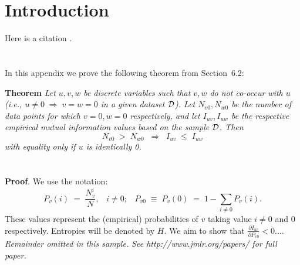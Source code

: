 \documentclass[twoside,11pt]{article}
\newcommand{\dataset}{{\cal D}}
\newcommand{\fracpartial}[2]{\frac{\partial #1}{\partial  #2}}
\begin{document}
\section{Introduction}

\blindmathpaper

Here is a citation \cite{chow:68}.




\newpage

\appendix
\section{}
\label{app:theorem}



In this appendix we prove the following theorem from
Section~6.2:

\noindent
{\bf Theorem} {\it Let $u,v,w$ be discrete variables such that $v, w$ do
not co-occur with $u$ (i.e., $u\neq0\;\Rightarrow \;v=w=0$ in a given
dataset $\dataset$). Let $N_{v0},N_{w0}$ be the number of data points for
which $v=0, w=0$ respectively, and let $I_{uv},I_{uw}$ be the
respective empirical mutual information values based on the sample
$\dataset$. Then
\[
	N_{v0} \;>\; N_{w0}\;\;\Rightarrow\;\;I_{uv} \;\leq\;I_{uw}
\]
with equality only if $u$ is identically 0.} \hfill\BlackBox

\section{}

\noindent
{\bf Proof}. We use the notation:
\[
P_v(i) \;=\;\frac{N_v^i}{N},\;\;\;i \neq 0;\;\;\;
P_{v0}\;\equiv\;P_v(0)\; = \;1 - \sum_{i\neq 0}P_v(i).
\]
These values represent the (empirical) probabilities of $v$
taking value $i\neq 0$ and 0 respectively.  Entropies will be denoted
by $H$. We aim to show that $\fracpartial{I_{uv}}{P_{v0}} < 0$....\\

{\noindent \em Remainder omitted in this sample. See http://www.jmlr.org/papers/ for full paper.}


\vskip 0.2in

\end{document}
